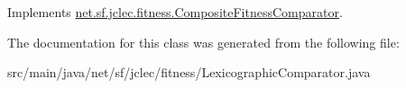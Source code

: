 Implements \hyperlink{classnet_1_1sf_1_1jclec_1_1fitness_1_1_composite_fitness_comparator_a6c060cd511a694dc0953e42ab05a4419}{net.\-sf.\-jclec.\-fitness.\-Composite\-Fitness\-Comparator}.



The documentation for this class was generated from the following file\-:\begin{DoxyCompactItemize}
\item 
src/main/java/net/sf/jclec/fitness/Lexicographic\-Comparator.\-java\end{DoxyCompactItemize}
